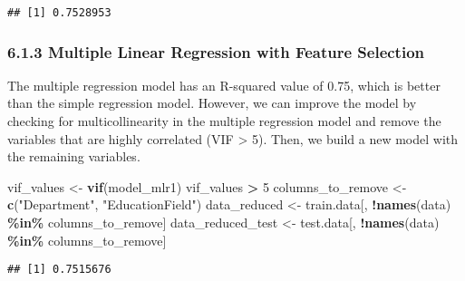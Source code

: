 \documentclass[
]{article}
\newenvironment{Shaded}{\begin{snugshade}}{\end{snugshade}}
\newcommand{\AttributeTok}[1]{\textcolor[rgb]{0.13,0.29,0.53}{#1}}
\newcommand{\DecValTok}[1]{\textcolor[rgb]{0.00,0.00,0.81}{#1}}
\newcommand{\FunctionTok}[1]{\textcolor[rgb]{0.13,0.29,0.53}{\textbf{#1}}}
\newcommand{\NormalTok}[1]{#1}
\newcommand{\OtherTok}[1]{\textcolor[rgb]{0.56,0.35,0.01}{#1}}
\newcommand{\SpecialCharTok}[1]{\textcolor[rgb]{0.81,0.36,0.00}{\textbf{#1}}}
\newcommand{\StringTok}[1]{\textcolor[rgb]{0.31,0.60,0.02}{#1}}
\begin{document}
\begin{verbatim}
## [1] 0.7528953
\end{verbatim}

\hypertarget{multiple-linear-regression-with-feature-selection}{%
\subsubsection{6.1.3 Multiple Linear Regression with Feature
Selection}\label{multiple-linear-regression-with-feature-selection}}

The multiple regression model has an R-squared value of 0.75, which is
better than the simple regression model. However, we can improve the
model by checking for multicollinearity in the multiple regression model
and remove the variables that are highly correlated (VIF \textgreater{}
5). Then, we build a new model with the remaining variables.

\begin{Shaded}
\begin{Highlighting}[]
\NormalTok{vif\_values }\OtherTok{\textless{}{-}} \FunctionTok{vif}\NormalTok{(model\_mlr1)}
\NormalTok{vif\_values }\SpecialCharTok{\textgreater{}} \DecValTok{5}
\NormalTok{columns\_to\_remove }\OtherTok{\textless{}{-}} \FunctionTok{c}\NormalTok{(}\StringTok{"Department"}\NormalTok{, }\StringTok{"EducationField"}\NormalTok{)}
\NormalTok{data\_reduced }\OtherTok{\textless{}{-}}\NormalTok{ train.data[, }\SpecialCharTok{!}\FunctionTok{names}\NormalTok{(data) }\SpecialCharTok{\%in\%}\NormalTok{ columns\_to\_remove]}
\NormalTok{data\_reduced\_test }\OtherTok{\textless{}{-}}\NormalTok{ test.data[, }\SpecialCharTok{!}\FunctionTok{names}\NormalTok{(data) }\SpecialCharTok{\%in\%}\NormalTok{ columns\_to\_remove]}
\end{Highlighting}
\end{Shaded}

\begin{Shaded}
\end{Shaded}

\begin{verbatim}
## [1] 0.7515676
\end{verbatim}
\end{document}
